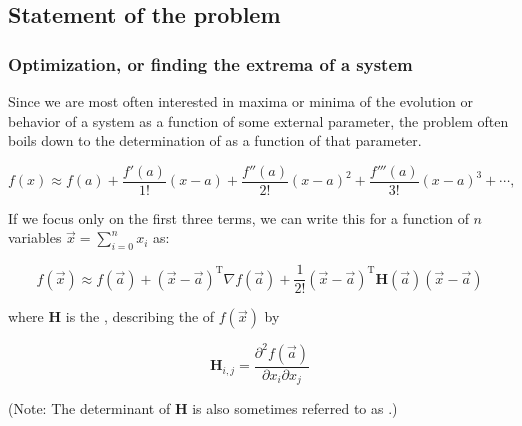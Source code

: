 \documentclass[hyperref={colorlinks=true}]{beamer}
\begin{document}
\subsection[Statement of the problem]{Statement of the problem}

\begin{frame}%
  \frametitle{Optimization, or finding the extrema of a system}

  Since we are most often interested in maxima or minima of the evolution or behavior of a system as a function of some external parameter, the problem often boils down to the determination of  as a function of that parameter.
  
  \begin{equation}
    f(x) \approx f(a)+{\frac {f'(a)}{1!}}(x-a)+{\frac {f''(a)}{2!}}(x-a)^{2}+{\frac {f'''(a)}{3!}}(x-a)^{3}+\cdots ,
  \end{equation}
  
  If we focus only on the first three terms, we can write this for a function of $n$ variables $\vec{x} = \sum_{i=0}^{n}x_i$ as:
  
  \begin{equation}
    f(\vec{x}) \approx f(\vec {a} )+ (\vec{x} - \vec{a})^{\mathrm {T} }  \nabla f(\vec{a}) +{\frac {1}{2!}}(\vec{x} - \vec{a})^{\mathrm {T} }\mathbf {H} (\vec{a})(\vec{x} - \vec{a})
  \end{equation}
  
  where $\mathbf {H}$ is the , describing the  of $f(\vec{x})$ by

  \begin{equation}
    {\mathbf {H} }_{i,j}={\frac {\partial ^{2}f(\vec{a})}{\partial x_{i}\partial x_{j}}}
  \end{equation}
  
  (Note: The determinant of $\mathbf {H}$ is also sometimes referred to as .)
  
\end{frame}

\end{document}
